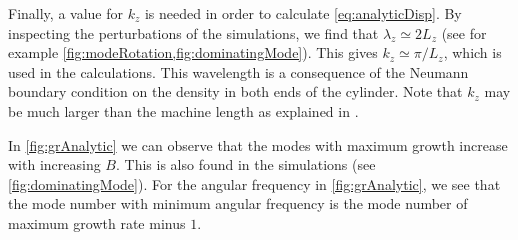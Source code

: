 Finally, a value for $k_z$ is needed in order to calculate \cref{eq:analyticDisp}.
By inspecting the perturbations of the simulations, we find that $\lambda_z \simeq 2L_z$ (see for example \cref{fig:modeRotation,fig:dominatingMode}).
This gives $k_z\simeq\pi/L_z$, which is used in the calculations.
This wavelength is a consequence of the Neumann boundary condition on the density in both ends of the cylinder.
Note that $k_z$ may be much larger than the machine length as explained in \cite{Chen1965}.

In \cref{fig:grAnalytic} we can observe that the modes with maximum growth increase with increasing $B$.
This is also found in the simulations (see \cref{fig:dominatingMode}).
For the angular frequency in \cref{fig:grAnalytic}, we see that the mode number with minimum angular frequency is the mode number of maximum growth rate minus $1$.
%
